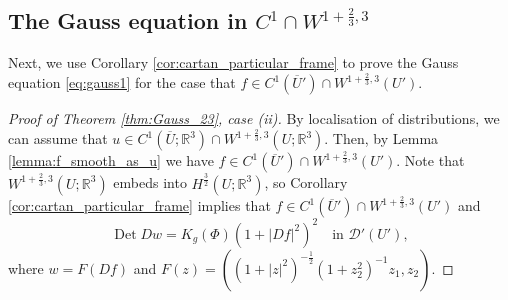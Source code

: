 \documentclass[12pt]{article}
\newcommand{\R}{\mathbb{R}}
\newcommand{\Det}{\operatorname{Det}}
\theoremstyle{plain}
\numberwithin{equation}{section}
\begin{document}
\subsection{The Gauss equation in $C^1 \cap W^{1+\frac23,3}$} \label{sec:W23_Gauss}

Next, we use Corollary \ref{cor:cartan_particular_frame} to prove the Gauss equation \eqref{eq:gauss1} for the case that $f \in C^1(\overline U') \cap W^{1+\frac23,3}(U')$. 

\begin{proof}[Proof of Theorem \ref{thm:Gauss_23}, case (ii)]
   By localisation of distributions, we can assume that $u \in C^1(\overline U; \R^3) \cap W^{1+\frac23,3}(U;\R^3)$. Then, by Lemma \ref{lemma:f_smooth_as_u} we have $f \in C^1(\overline U') \cap W^{1+\frac23,3}(U')$. Note that $W^{1+\frac23,3}(U;\R^3)$ embeds into $H^\frac32(U;\R^3)$, so Corollary \ref{cor:cartan_particular_frame} implies that $f \in C^1(\overline U') \cap W^{1+\frac23,3}(U')$ and
   \begin{equation*}
       \Det Dw = K_g(\Phi)(1+|Df|^2)^2 \quad \text{in } \mathcal{D}'(U'),
   \end{equation*}
   where $w = F(Df)$ and $F(z) = ((1+|z|^2)^{-\frac12}(1+z_2^2)^{-1}z_1,z_2)$. 
   

\end{proof}
\end{document}

